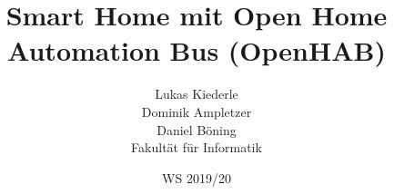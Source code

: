 \documentclass[twoside=true, %
    DIV=15
    ,%
    BCOR=15mm, %
    headinclude=true,
    footinclude=false,
    pagesize,%
    fontsize=11pt,%
    paper=a4,%
    numbers=noenddot
  ]{scrartcl}
\begin{document}
\def\figdir{figures}
\def\tabledir{tables}

\titlehead{
\raggedleft
\texttt{[image: \\figdir/logo-th-rosenheim-2019\_master\_quer\_2c.eps]}
}

\title{
\vspace*{0cm}
Smart Home mit Open Home Automation Bus (OpenHAB)
}

\author{
Lukas Kiederle\\
Dominik Ampletzer\\
Daniel Böning\\
Fakultät für Informatik}

\date{WS 2019/20}

\maketitle

\cleardoubleemptypage

\tableofcontents










\appendix





\end{document}
